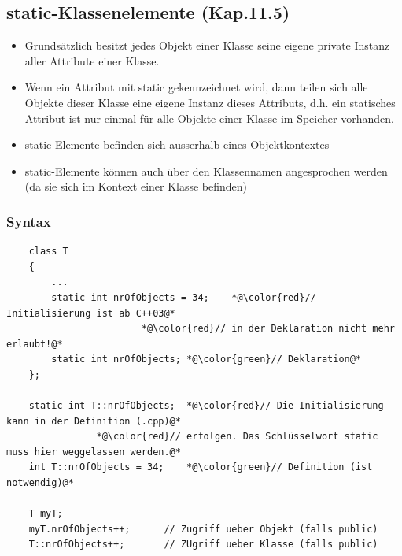 \subsection{static-Klassenelemente (Kap.11.5)}
\label{sec:static-Klassenelemente}
\begin{itemize}
	\item Grundsätzlich besitzt jedes Objekt einer Klasse seine eigene private Instanz aller Attribute einer Klasse.
	\item Wenn ein Attribut mit static gekennzeichnet wird, dann teilen sich alle Objekte dieser Klasse eine eigene Instanz dieses Attributs, d.h. ein statisches Attribut ist nur einmal für alle Objekte einer Klasse im Speicher vorhanden.
	\item static-Elemente befinden sich ausserhalb eines Objektkontextes
	\item static-Elemente können auch über den Klassennamen angesprochen werden (da sie sich im Kontext einer Klasse befinden)
\end{itemize}

\subsubsection{Syntax}
\label{sec:static-Klassenelemente: Syntax}
\noindent
\begin{minipage}{\linewidth}
	\begin{lstlisting}
	class T
	{
		...
		static int nrOfObjects = 34;	*@\color{red}// Initialisierung ist ab C++03@* 
						*@\color{red}// in der Deklaration nicht mehr erlaubt!@*
		static int nrOfObjects;	*@\color{green}// Deklaration@*
	};
	
	static int T::nrOfObjects;	*@\color{red}// Die Initialisierung kann in der Definition (.cpp)@*
				*@\color{red}// erfolgen. Das Schlüsselwort static muss hier weggelassen werden.@*
	int T::nrOfObjects = 34;	*@\color{green}// Definition (ist notwendig)@*
	
	T myT;
	myT.nrOfObjects++;		// Zugriff ueber Objekt (falls public)
	T::nrOfObjects++;		// ZUgriff ueber Klasse (falls public)
	\end{lstlisting}
\end{minipage}


